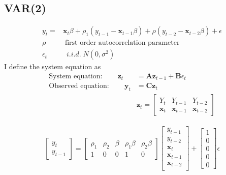 \documentclass[11pt]{article}
\begin{document}
\subsection{VAR(2)}
 \begin{align*}
    y_t =& \mathbf{x}_t\beta + \rho_1(y_{t-1} - \mathbf{x}_{t-1} \beta) +\rho(y_{t-2} - \mathbf{x}_{t-2} \beta) +\epsilon \\
    \rho &\; \text{first order autocorrelation parameter} \\
    \epsilon_t & \; ~ i.i.d. \; N(0,\sigma^2) 
\end{align*}
I define the system equation as
\begin{align*}
    \text{System equation}: \qquad \mathbf{z}_t & = \mathbf{A} \mathbf{z}_{t-1}+ \mathbf{B} \epsilon_t \\
    \text{Observed equation}: \qquad \mathbf{y}_t & = \mathbf{C} \mathbf{z}_t \\
& \mathbf{z}_t = \begin{bmatrix}
    Y_t & Y_{t-1}  & Y_{t-2} \\
    \mathbf{x}_t & \mathbf{x}_{t-1}  & \mathbf{x}_{t-2} 
\end{bmatrix}
\end{align*}

\begin{align*}
    \begin{bmatrix}
   y_t\\
     y_{t-1}
\end{bmatrix}	 = 
\begin{bmatrix}
    \rho_1 & \rho_2 & \beta & \rho_1 \beta & \rho_2 \beta \\
    1 & 0 & 0 & 1 & 0 
\end{bmatrix} 
\begin{bmatrix}
    y_{t-1} \\
    y_{t-2} \\
    \mathbf{x}_t \\
    \mathbf{x}_{t-1} \\
    \mathbf{x}_{t-2} \\
\end{bmatrix} +
\begin{bmatrix}
    1 \\
    0 \\
    0 \\
    0 \\
    0
\end{bmatrix}
\epsilon
\end{align*}
\end{document}
